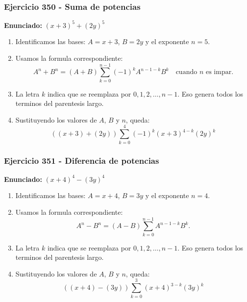 \documentclass[11pt,a4paper]{article}
\begin{document}
\subsubsection*{Ejercicio 350 - Suma de potencias}
\textbf{Enunciado:} $ \left(x + 3\right)^{5}+\left(2 y\right)^{5} $\par
\begin{enumerate}[leftmargin=2em]
\item Identificamos las bases: \(A=x + 3\), \(B=2 y\) y el exponente \(n=5\).
\item Usamos la formula correspondiente: \[A^n+B^n=(A+B)\sum_{k=0}^{n-1}(-1)^kA^{n-1-k}B^k\quad\text{cuando }n\text{ es impar}.\]
\item La letra \(k\) indica que se reemplaza por \(0,1,2,\ldots,n-1\). Eso genera todos los terminos del parentesis largo.
\item Sustituyendo los valores de \(A\), \(B\) y \(n\), queda: \[\boxed{\left(\left(x + 3\right)+\left(2 y\right)\right)\sum_{k=0}^{4}(-1)^k\left(x + 3\right)^{4-k}\left(2 y\right)^k}\]
\end{enumerate}

\vspace{0.2cm}
\subsubsection*{Ejercicio 351 - Diferencia de potencias}
\textbf{Enunciado:} $ \left(x + 4\right)^{4}-\left(3 y\right)^{4} $\par
\begin{enumerate}[leftmargin=2em]
\item Identificamos las bases: \(A=x + 4\), \(B=3 y\) y el exponente \(n=4\).
\item Usamos la formula correspondiente: \[A^n-B^n=(A-B)\sum_{k=0}^{n-1}A^{n-1-k}B^k.\]
\item La letra \(k\) indica que se reemplaza por \(0,1,2,\ldots,n-1\). Eso genera todos los terminos del parentesis largo.
\item Sustituyendo los valores de \(A\), \(B\) y \(n\), queda: \[\boxed{\left(\left(x + 4\right)-\left(3 y\right)\right)\sum_{k=0}^{3}\left(x + 4\right)^{3-k}\left(3 y\right)^k}\]
\end{enumerate}

\vspace{0.2cm}
\end{document}
